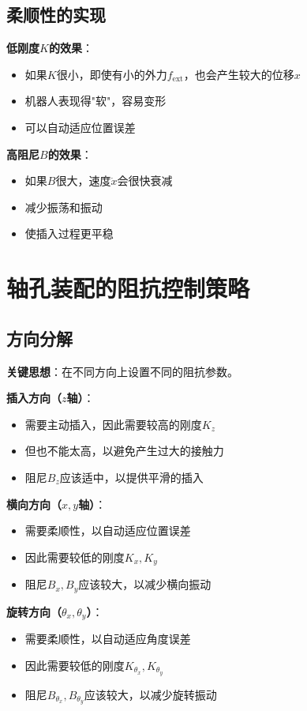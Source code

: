 \documentclass[12pt,a4paper]{article}
\begin{document}
\subsection{柔顺性的实现}

\textbf{低刚度$K$的效果}：
\begin{itemize}
\item 如果$K$很小，即使有小的外力$f_{\text{ext}}$，也会产生较大的位移$x$
\item 机器人表现得"软"，容易变形
\item 可以自动适应位置误差
\end{itemize}

\textbf{高阻尼$B$的效果}：
\begin{itemize}
\item 如果$B$很大，速度$\dot{x}$会很快衰减
\item 减少振荡和振动
\item 使插入过程更平稳
\end{itemize}

\section{轴孔装配的阻抗控制策略}

\subsection{方向分解}

\textbf{关键思想}：在不同方向上设置不同的阻抗参数。

\textbf{插入方向（$z$轴）}：
\begin{itemize}
\item 需要主动插入，因此需要较高的刚度$K_z$
\item 但也不能太高，以避免产生过大的接触力
\item 阻尼$B_z$应该适中，以提供平滑的插入
\end{itemize}

\textbf{横向方向（$x, y$轴）}：
\begin{itemize}
\item 需要柔顺性，以自动适应位置误差
\item 因此需要较低的刚度$K_x, K_y$
\item 阻尼$B_x, B_y$应该较大，以减少横向振动
\end{itemize}

\textbf{旋转方向（$\theta_x, \theta_y$）}：
\begin{itemize}
\item 需要柔顺性，以自动适应角度误差
\item 因此需要较低的刚度$K_{\theta_x}, K_{\theta_y}$
\item 阻尼$B_{\theta_x}, B_{\theta_y}$应该较大，以减少旋转振动
\end{itemize}
\end{document}
